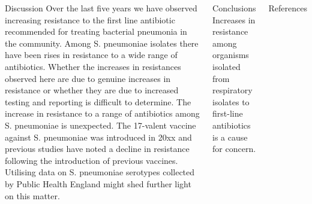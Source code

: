 \documentclass[final]{beamer}
\begin{document}
\begin{frame}
\begin{columns}[t]
  \begin{block}{Discussion}
  Over the last five years we have observed increasing resistance to the first line antibiotic recommended for treating bacterial pneumonia in the community.
  Among S. pneumoniae isolates there have been rises in resistance to a wide range of antibiotics. 
  Whether the increases in resistances observed here are due to genuine increases in resistance or whether they are due to increased testing and reporting is difficult to determine. 
  The increase in resistance to a range of antibiotics among S. pneumoniae is unexpected. 
  The 17-valent vaccine against S. pneumoniae was introduced in 20xx and previous studies have noted a decline in resistance following the introduction of previous vaccines. %
  Utilising data on S. pneumoniae serotypes collected by Public Health England might shed further light on this matter. 
  \end{block}
  
  \begin{block}{Conclusions}
  Increases in resistance among organisms isolated from respiratory isolates to first-line antibiotics is a cause for concern. 
  
   
  \end{block}
  
  \begin{block}{References}
   

  \end{block}
 \end{columns}

\end{frame}
\end{document}

